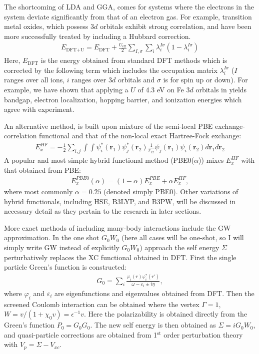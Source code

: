The shortcoming of LDA and GGA, comes for systems where the electrons in the system deviate significantly from that of an electron gas. For example, transition metal oxides, which possess $3d$ orbitals exhibit strong correlation, and have been more successfully treated by including a Hubbard correction.~\cite{dudarev1998electron}
\begin{align}
    E_{\text{DFT}+\text{U}}=E_{\text{DFT}}+\frac{U_{\text{eff}}}{2}\sum_{I,\sigma}\sum_{i}\lambda_{i}^{I\sigma}(1-\lambda_{i}^{I\sigma})
    \label{intro:eq:U}
\end{align}
Here, $E_\text{DFT}$ is the energy obtained from standard DFT methods which is corrected by the following term which includes the occupation matrix $\lambda_i^{I\sigma}$ ($I$ ranges over all ions, $i$ ranges over $3d$ orbitals and $\sigma$ is for spin up or down). For example, we have shown that applying a $U$ of 4.3 eV on Fe $3d$ orbitals in  yields bandgap, electron localization, hopping barrier, and ionization energies which agree with experiment.~\cite{smart2017effect}

An alternative method, is built upon mixture of the semi-local PBE exchange-correlation functional and that of the non-local exact Hartree-Fock exchange:
\begin{align}
    E_x^{HF} = -\frac{1}{2} \sum_{i,j} \int\int \psi_i^*(\textbf{r}_1)\psi_j^*(\textbf{r}_2) \frac{1}{r_{12}} \psi_j(\textbf{r}_1)\psi_i(\textbf{r}_2) d\textbf{r}_1 d\textbf{r}_2
    \label{intro:eq:HF}
\end{align}
A popular and most simple hybrid functional method (PBE0($\alpha$)) mixes $E_x^{HF}$ with that obtained from PBE:
\begin{align}
    E_{x}^{PBE0}(\alpha) = (1-\alpha) E_x^{PBE} + \alpha E_x^{HF},
    \label{intro:eq:PBE0a}
\end{align}
where most commonly $\alpha=0.25$ (denoted simply PBE0). Other variations of hybrid functionals, including HSE, B3LYP, and B3PW, will be discussed in necessary detail as they pertain to the research in later sections.


More exact methods of including many-body interactions include the GW approximation. In the one shot $G_0W_0$ (here all cases will be one-shot, so I will simply write GW instead of explicitly $G_0W_0$) approach the self energy $\Sigma$ perturbatively replaces the XC functional obtained in DFT. First the single particle Green's function is constructed:
\begin{align}
    G_0 = \sum_i \frac{\varphi_i(r)\varphi_i^*(r')}{\omega-\varepsilon_i \pm i\eta },
    \label{intro:eq:g0}
\end{align}
where $\varphi_i$ and $\varepsilon_i$ are eigenfunctions and eigenvalues obtained from DFT. Then the screened Coulomb interaction can be obtained where the vertex $\Gamma = 1$, $W = v/(1+\chi_0 v) = \epsilon^{-1} v$. Here the polarizability is obtained directly from the Green's function $P_0=G_0G_0$. The new self energy is then obtained as $\Sigma = iG_0W_0$, and quasi-particle corrections are obtained from 1$^\text{st}$ order perturbation theory with $V_p = \Sigma - V_{xc}$.



